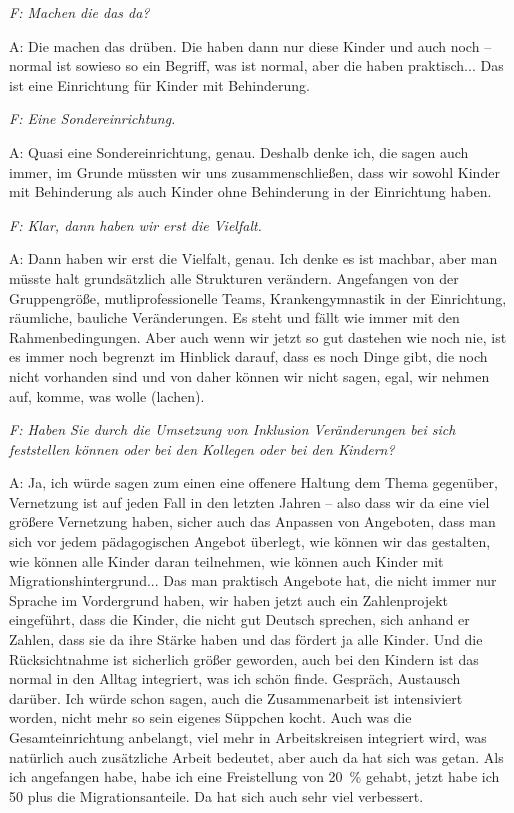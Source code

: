 \begin{linenumbers*}
\emph{F: Machen die das da?}

A: Die machen das drüben. Die haben dann nur diese Kinder und auch noch -- normal ist sowieso so ein Begriff, was ist normal, aber die haben praktisch... Das ist eine Einrichtung für Kinder mit Behinderung. 

\emph{F: Eine Sondereinrichtung.}

A: Quasi eine Sondereinrichtung, genau.
Deshalb denke ich, die sagen auch immer, im Grunde müssten wir uns zusammenschließen, dass wir sowohl Kinder mit Behinderung als auch Kinder ohne Behinderung in der Einrichtung haben.

\emph{F: Klar, dann haben wir erst die Vielfalt.}

A: Dann haben wir erst die Vielfalt, genau. Ich denke es ist machbar, aber man müsste halt grundsätzlich alle Strukturen verändern. Angefangen von der Gruppengröße, mutliprofessionelle Teams, Krankengymnastik in der Einrichtung, räumliche, bauliche Veränderungen. Es steht und fällt wie immer mit den Rahmenbedingungen. 
Aber auch wenn wir jetzt so gut dastehen wie noch nie, ist es immer noch begrenzt im Hinblick darauf, dass es noch Dinge gibt, die noch nicht vorhanden sind und von daher können wir nicht sagen, egal, wir nehmen auf, komme, was wolle (lachen).

\emph{F: Haben Sie durch die Umsetzung von Inklusion Veränderungen bei sich feststellen können oder bei den Kollegen oder bei den Kindern?} 

A: Ja, ich würde sagen zum einen eine offenere Haltung dem Thema gegenüber, Vernetzung ist auf jeden Fall in den letzten Jahren -- also dass wir da eine viel größere Vernetzung haben, sicher auch das Anpassen von Angeboten, dass man sich vor jedem pädagogischen Angebot überlegt, wie können wir das gestalten, wie können alle Kinder daran teilnehmen, wie können auch Kinder mit Migrationshintergrund... Das man praktisch Angebote hat, die nicht immer nur Sprache im Vordergrund haben, wir haben jetzt auch ein  Zahlenprojekt eingeführt, dass die Kinder, die nicht gut Deutsch sprechen, sich anhand er Zahlen, dass sie da ihre Stärke haben und das fördert ja alle Kinder. Und die Rücksichtnahme ist sicherlich größer geworden, auch bei den Kindern ist das normal in den Alltag integriert, was ich schön finde. Gespräch, Austausch darüber. Ich würde schon sagen, auch die Zusammenarbeit ist intensiviert worden, nicht mehr so sein eigenes Süppchen kocht. Auch was die Gesamteinrichtung anbelangt, viel mehr in Arbeitskreisen integriert wird, was natürlich auch zusätzliche Arbeit bedeutet, aber auch da hat sich was getan. Als ich angefangen habe, habe ich eine Freistellung von 20~\% gehabt, jetzt habe ich 50 plus die Migrationsanteile. Da hat sich auch sehr viel verbessert. 


\end{linenumbers*}
